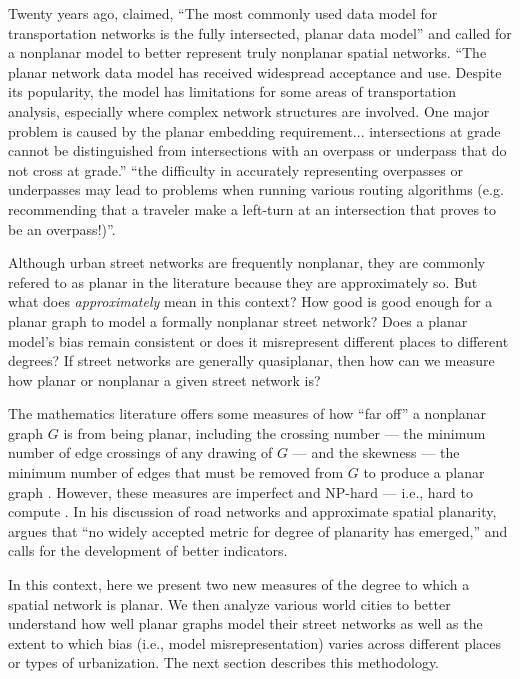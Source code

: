 \documentclass[Afour,sageh,times]{sagej}
\begin{document}
Twenty years ago, \citep[p.~18]{fohl_non-planar_1996} claimed, \enquote{The most commonly used data model for transportation networks is the fully intersected, planar data model} and called for a nonplanar model to better represent truly nonplanar spatial networks. \enquote{The planar network data model has received widespread acceptance and use. Despite its popularity, the model has limitations for some areas of transportation analysis, especially where complex network structures are involved. One major problem is caused by the planar embedding requirement... intersections at grade cannot be distinguished from intersections with an overpass or underpass that do not cross at grade.} \citep[p.~395]{fischer_gis_2004} \citet[p.~6]{kwan_review_1996} \enquote{the difficulty in accurately representing overpasses or underpasses may lead to problems when running various routing algorithms (e.g. recommending that a traveler make a left-turn at an intersection that proves to be an overpass!)}.

Although urban street networks are frequently nonplanar, they are commonly refered to as planar in the literature because they are approximately so. But what does \emph{approximately} mean in this context? How good is good enough for a planar graph to model a formally nonplanar street network? Does a planar model's bias remain consistent or does it misrepresent different places to different degrees? If street networks are generally quasiplanar, then how can we measure how planar or nonplanar a given street network is?

The mathematics literature offers some measures of how \enquote{far off} a nonplanar graph $G$ is from being planar, including the crossing number --- the minimum number of edge crossings of any drawing of $G$ --- and the skewness --- the minimum number of edges that must be removed from $G$ to produce a planar graph \citep{liebers_planarizing_2001,szekely_successful_2004,chimani_non-planar_2009}. However, these measures are imperfect and NP-hard --- i.e., hard to compute \citep{chimani_vertex_2012,szekely_successful_2004}. In his discussion of road networks and approximate spatial planarity, \citet[p.~133]{newman_networks:_2010} argues that \enquote{no widely accepted metric for degree of planarity has emerged,} and calls for the development of better indicators.

In this context, here we present two new measures of the degree to which a spatial network is planar. We then analyze various world cities to better understand how well planar graphs model their street networks as well as the extent to which bias (i.e., model misrepresentation) varies across different places or types of urbanization. The next section describes this methodology.
\end{document}
